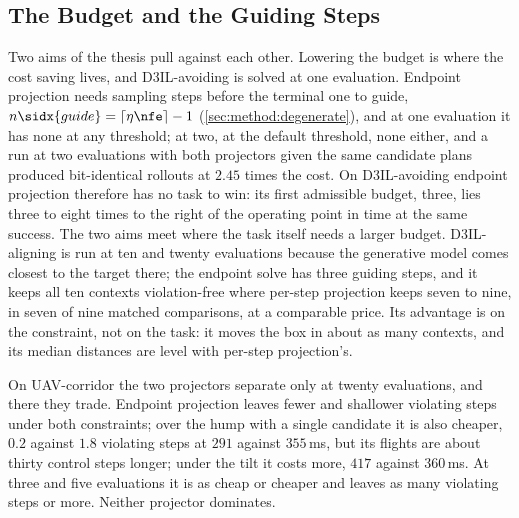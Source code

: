 \subsection{The Budget and the Guiding Steps}\label{sec:disc:budget}

Two aims of the thesis pull against each other. Lowering the budget is where the cost saving lives,
and D3IL-avoiding is solved at one evaluation. Endpoint projection needs sampling steps before the
terminal one to guide, $n\sidx{guide} = \lceil \eta\nfe \rceil - 1$ (\autoref{sec:method:degenerate}),
and at one evaluation it has none at any threshold; at two, at the default threshold, none either, and a
run at two evaluations with both projectors given the same candidate plans produced bit-identical
rollouts at $2.45$ times the cost. On D3IL-avoiding endpoint projection therefore has no task to win:
its first admissible budget, three, lies three to eight times to the right of the operating point in
time at the same success. The two aims meet where the task itself needs a larger budget. D3IL-aligning
is run at ten and twenty evaluations because the generative model comes closest to the target there;
the endpoint solve has three guiding steps, and it keeps all ten contexts violation-free where per-step
projection keeps seven to nine, in seven of nine matched comparisons, at a comparable price. Its
advantage is on the constraint, not on the task: it moves the box in about as many contexts, and its
median distances are level with per-step projection's.

On UAV-corridor the two projectors separate only at twenty evaluations, and there they trade. Endpoint
projection leaves fewer and shallower violating steps under both constraints; over the hump with a
single candidate it is also cheaper, $0.2$ against $1.8$ violating steps at $291$ against $355$\,ms, but
its flights are about thirty control steps longer; under the tilt it costs more, $417$ against
$360$\,ms. At three and five evaluations it is as cheap or cheaper and leaves as many violating steps
or more. Neither projector dominates. 


